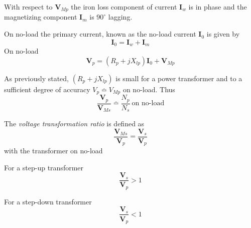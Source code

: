 \documentclass[a4paper,numbers=noenddot,12pt]{scrbook}
\begin{document}
                With respect to $\mathbf{V}_{Mp}$ the iron loss component of current $\mathbf{I}_w$ is in phase and the magnetizing component $\mathbf{I}_m$ is $90^\circ$ lagging.

                On no-load the primary current, known as the no-load current $\mathbf{I}_0$ is given by
                \begin{equation}
                    \mathbf{I}_0 = \mathbf{I}_w + \mathbf{I}_m
                    \label{eq:Eq2.65}
                \end{equation}
                On no-load
                \begin{equation}
                    \mathbf{V}_p = (R_p + jX_{lp}) \mathbf{I}_0 + \mathbf{V}_{Mp}
                    \label{eq:Eq2.66}
                \end{equation}

                As previously stated, $(R_p + jX_{lp})$ is small for a power transformer and to a sufficient degree of accuracy $V_p \bumpeq V_{Mp}$ on no-load. Thus
                \begin{equation}
                    \dfrac{\mathbf{V}_p}{\mathbf{V}_{Ms}} \bumpeq \dfrac{N_p}{N_s} \ \text{on no-load}
                    \label{eq:Eq2.67}
                \end{equation}

                The \textit{voltage transformation ratio} is defined as
                \begin{equation}
                    \dfrac{\mathbf{V}_{Ms}}{\mathbf{V}_p} = \dfrac{\mathbf{V}_s}{\mathbf{V}_p}
                    \label{eq:Eq2.68}
                \end{equation}
                with the transformer on no-load

                For a step-up transformer
                \begin{equation*}
                    \dfrac{\mathbf{V}_s}{\mathbf{V}_p} > 1
                \end{equation*}

                For a step-down transformer
                \begin{equation*}
                    \dfrac{\mathbf{V}_s}{\mathbf{V}_p} < 1
                \end{equation*}
\end{document}
